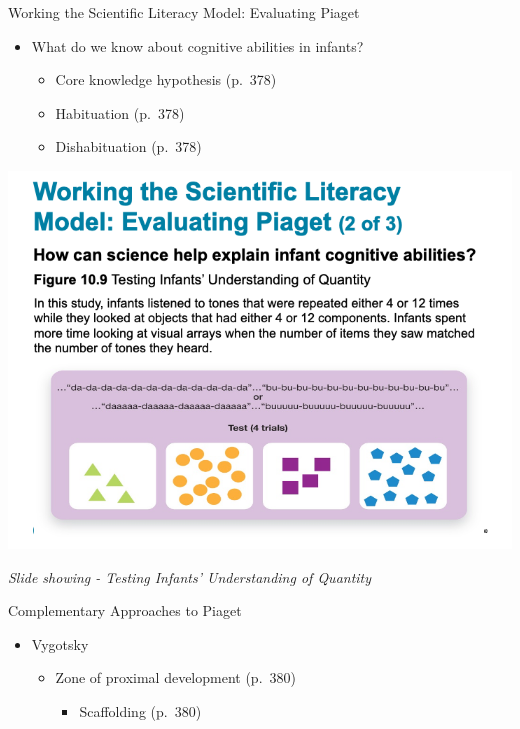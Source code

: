 \documentclass[
]{book}
\providecommand{\tightlist}{%
  \setlength{\itemsep}{0pt}\setlength{\parskip}{0pt}}
\begin{document}
\begin{reflect}
Working the Scientific Literacy Model: Evaluating Piaget

\begin{itemize}
\tightlist
\item
  What do we know about cognitive abilities in infants?

  \begin{itemize}
  \tightlist
  \item
    Core knowledge hypothesis (p.~378)\\
  \item
    Habituation (p.~378)\\
  \item
    Dishabituation (p.~378)
  \end{itemize}
\end{itemize}

\includegraphics{assets/unit_3/slide_31.png}

\emph{Slide showing - Testing Infants' Understanding of Quantity}

Complementary Approaches to Piaget

\begin{itemize}
\tightlist
\item
  Vygotsky

  \begin{itemize}
  \tightlist
  \item
    Zone of proximal development (p.~380)

    \begin{itemize}
    \tightlist
    \item
      Scaffolding (p.~380)


\end{itemize}
\end{itemize}
\end{itemize}
\end{reflect}
\end{document}
